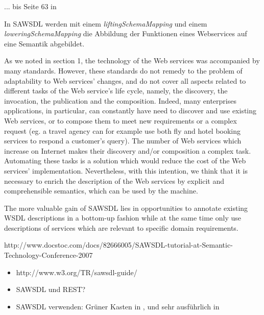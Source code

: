 ... bis Seite 63 in \cite{ky-sawsdl}

In \ac{SAWSDL} werden mit einem \emph{liftingSchemaMapping} und einem \emph{loweringSchemaMapping} die Abbildung der Funktionen eines Webservices auf eine Semantik abgebildet.

As we noted in section 1, the technology of the Web
services was accompanied by many standards. However,
these standards do not remedy to the problem of adaptability
to Web services’ changes, and do not cover all aspects related
to different tasks of the Web service’s life cycle, namely, the
discovery, the invocation, the publication and the
composition. Indeed, many enterprises applications, in
particular, can constantly have need to discover and use
existing Web services, or to compose them to meet new
requirements or a complex request (eg. a travel agency can
for example use both fly and hotel booking services to
respond a customer’s query). The number of Web services
which increase on Internet makes their discovery and/or
composition a complex task. Automating these tasks is a
solution which would reduce the cost of the Web services’
implementation. Nevertheless, with this intention, we think
that it is necessary to enrich the description of the Web
services by explicit and comprehensible semantics, which can
be used by the machine. \cite{ei-sawsdl}

The more valuable
gain of SAWSDL lies in opportunities to annotate existing
WSDL descriptions in a bottom-up fashion while at the
same time only use descriptions of services which are relevant
to specific domain requirements. \cite{WSMOLITE}

http://www.docstoc.com/docs/82666005/SAWSDL-tutorial-at-Semantic-Technology-Conference-2007

\begin{itemize}
\item http://www.w3.org/TR/sawsdl-guide/
\item \ac{SAWSDL} und \ac{REST}? \cite{xn-sss}
\item \ac{SAWSDL} verwenden: Grüner Kasten in \cite[S.63]{ky-sawsdl}, \cite{flexbrok} und sehr ausführlich in \cite{vr-sesa}
\end{itemize}